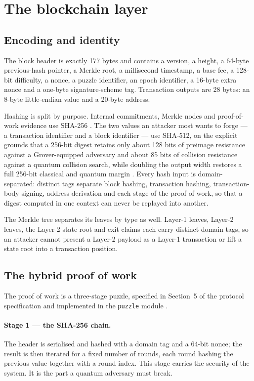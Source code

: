 \documentclass{article}
\begin{document}
\section{The blockchain layer}
\label{sec:l1}

\subsection{Encoding and identity}

The block header is exactly 177 bytes and contains a version, a height, a
64-byte previous-hash pointer, a Merkle root, a millisecond timestamp, a base
fee, a 128-bit difficulty, a nonce, a puzzle identifier, an epoch identifier, a
16-byte extra nonce and a one-byte signature-scheme tag. Transaction outputs
are 28 bytes: an 8-byte little-endian value and a 20-byte address.

Hashing is split by purpose. Internal commitments, Merkle nodes and proof-of-work
evidence use SHA-256 \cite{nist-fips180-4}. The two values an attacker most
wants to forge --- a transaction identifier and a block identifier --- use
SHA-512, on the explicit grounds that a 256-bit digest retains only about 128
bits of preimage resistance against a Grover-equipped adversary and about 85
bits of collision resistance against a quantum collision search, while doubling
the output width restores a full 256-bit classical and quantum margin
\cite{shor1994algorithms,grover1996fast}. Every hash input is domain-separated:
distinct tags separate block hashing, transaction hashing, transaction-body
signing, address derivation and each stage of the proof of work, so that a
digest computed in one context can never be replayed into another.

The Merkle tree separates its leaves by type as well. Layer-1 leaves, Layer-2
leaves, the Layer-2 state root and exit claims each carry distinct domain
tags, so an attacker cannot present a Layer-2 payload as a Layer-1 transaction
or lift a state root into a transaction position.

\subsection{The hybrid proof of work}
\label{sec:pow}

The proof of work is a three-stage puzzle, specified in
Section~5 of the protocol specification and implemented in the \texttt{puzzle}
module \cite{srct-spec}.

\paragraph{Stage 1 --- the SHA-256 chain.} The header is serialised and hashed
with a domain tag and a 64-bit nonce; the result is then iterated for a fixed
number of rounds, each round hashing the previous value together with a
round index. This stage carries the security of the system. It is the part a
quantum adversary must break.
\end{document}
